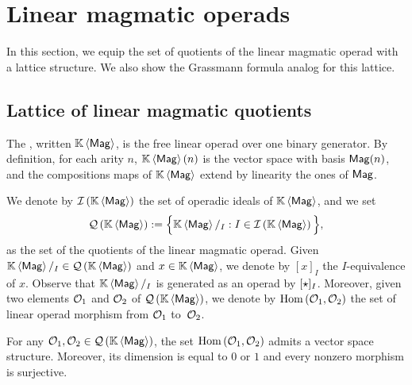 \section{Linear magmatic operads} \label{sec:Magmatic_operads}
In this section, we equip the set of quotients of the linear magmatic
operad with a lattice structure. We also show the Grassmann formula
analog for this lattice.
\medbreak

\subsection{Lattice of linear magmatic quotients}
The , written $\KMag$, is the free linear
operad over one binary generator. By definition, for each arity $n$,
$\KMag(n)$ is the vector space with basis $\Mag(n)$, and the
compositions maps of $\KMag$ extend by linearity the ones of $\Mag$.
\medbreak

We denote by $\IMag$ the set of operadic ideals of $\KMag$, and we set
\begin{equation} \label{equ:definition_of_QMag}
    \QMag := \Big\{\KMag/_I :  I\in\IMag\Big\},
\end{equation}
as the set of the quotients of the linear magmatic operad. Given
$\KMag/_I \in \QMag$ and $x \in \KMag$, we denote by $[x]_I$ the
$I$-equivalence of $x$. Observe that $\KMag/_I$ is generated as an
operad by $[\Product]_I$. Moreover, given two  elements $\Oca_1$ and
$\Oca_2$ of $\QMag$, we denote by $\Hom\left(\Oca_1,\Oca_2\right)$ the
set of linear operad morphism from $\Oca_1$ to~$\Oca_2$.
\medbreak

\begin{Proposition} \label{prop:endomorphisms_of_magmatic_operads}
    For any $\Oca_1, \Oca_2 \in \QMag$, the set
    $\Hom\left(\Oca_1,\Oca_2\right)$ admits a vector space structure.
    Moreover, its dimension is equal to $0$ or $1$ and every nonzero
    morphism is surjective.
\end{Proposition}

